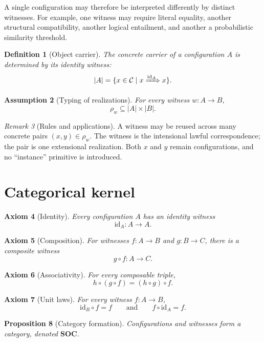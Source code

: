 \documentclass[11pt]{article}
\newtheorem{definition}{Definition}[section]
\newtheorem{axiom}[definition]{Axiom}
\newtheorem{assumption}[definition]{Assumption}
\newtheorem{proposition}[definition]{Proposition}
\theoremstyle{remark}
\newtheorem{remark}[definition]{Remark}
\newcommand{\Conf}{\mathcal{C}}
\newcommand{\id}{\mathrm{id}}
\newcommand{\realizes}[1]{\xRightarrow{#1}}
\newcommand{\carrier}[1]{\lvert #1 \rvert}
\begin{document}
A single configuration may therefore be interpreted differently by distinct
witnesses. For example, one witness may require literal equality, another
structural compatibility, another logical entailment, and another a
probabilistic similarity threshold.

\begin{definition}[Object carrier]
The concrete carrier of a configuration $A$ is determined by its identity
witness:
\[
  \carrier{A}
  =
  \{x\in\Conf\mid x\realizes{\id_A}x\}.
\]
\end{definition}

\begin{assumption}[Typing of realizations]
For every witness $w:A\to B$,
\[
  \rho_w \subseteq \carrier{A}\times\carrier{B}.
\]
\end{assumption}

\begin{remark}[Rules and applications]
A witness may be reused across many concrete pairs $(x,y)\in\rho_w$. The
witness is the intensional lawful correspondence; the pair is one extensional
realization. Both $x$ and $y$ remain configurations, and no ``instance''
primitive is introduced.
\end{remark}

\section{Categorical kernel}

\begin{axiom}[Identity]
Every configuration $A$ has an identity witness
\[
  \id_A:A\to A.
\]
\end{axiom}

\begin{axiom}[Composition]
For witnesses $f:A\to B$ and $g:B\to C$, there is a composite witness
\[
  g\circ f:A\to C.
\]
\end{axiom}

\begin{axiom}[Associativity]
For every composable triple,
\[
  h\circ(g\circ f)=(h\circ g)\circ f.
\]
\end{axiom}

\begin{axiom}[Unit laws]
For every witness $f:A\to B$,
\[
  \id_B\circ f=f
  \qquad\text{and}\qquad
  f\circ\id_A=f.
\]
\end{axiom}

\begin{proposition}[Category formation]
Configurations and witnesses form a category, denoted
$\mathbf{SOC}$.
\end{proposition}
\end{document}

